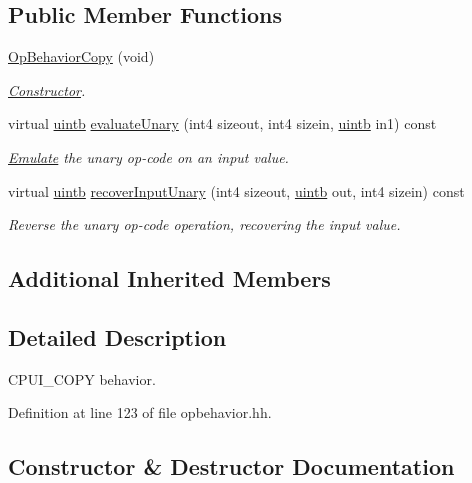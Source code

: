 \subsection*{Public Member Functions}
\begin{DoxyCompactItemize}
\item 
\mbox{\hyperlink{class_op_behavior_copy_a98787d4892d1a25947619160d843f62d}{Op\+Behavior\+Copy}} (void)
\begin{DoxyCompactList}\small\item\em \mbox{\hyperlink{class_constructor}{Constructor}}. \end{DoxyCompactList}\item 
virtual \mbox{\hyperlink{types_8h_a2db313c5d32a12b01d26ac9b3bca178f}{uintb}} \mbox{\hyperlink{class_op_behavior_copy_a066689b1b401477e46a6cd8376bfc2ca}{evaluate\+Unary}} (int4 sizeout, int4 sizein, \mbox{\hyperlink{types_8h_a2db313c5d32a12b01d26ac9b3bca178f}{uintb}} in1) const
\begin{DoxyCompactList}\small\item\em \mbox{\hyperlink{class_emulate}{Emulate}} the unary op-\/code on an input value. \end{DoxyCompactList}\item 
virtual \mbox{\hyperlink{types_8h_a2db313c5d32a12b01d26ac9b3bca178f}{uintb}} \mbox{\hyperlink{class_op_behavior_copy_a55e554798a0b0c529f0f42218c2acda3}{recover\+Input\+Unary}} (int4 sizeout, \mbox{\hyperlink{types_8h_a2db313c5d32a12b01d26ac9b3bca178f}{uintb}} out, int4 sizein) const
\begin{DoxyCompactList}\small\item\em Reverse the unary op-\/code operation, recovering the input value. \end{DoxyCompactList}\end{DoxyCompactItemize}
\subsection*{Additional Inherited Members}


\subsection{Detailed Description}
C\+P\+U\+I\+\_\+\+C\+O\+PY behavior. 

Definition at line 123 of file opbehavior.\+hh.



\subsection{Constructor \& Destructor Documentation}
\mbox{\label{class_op_behavior_copy_a98787d4892d1a25947619160d843f62d}} 

